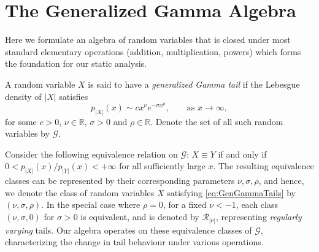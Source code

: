 \section{The Generalized Gamma Algebra}\label{sec:gga}

Here we formulate an algebra of random variables that is closed under most standard elementary operations (addition, multiplication, powers) which forms the foundation for our static analysis.

\begin{definition}\label{def:gg_tail}
A random variable $X$ is said to have a \emph{generalized Gamma tail} if the Lebesgue density of $|X|$ satisfies
\begin{equation}
\label{eq:GenGammaTails}
p_{|X|}(x) \sim c x^\nu e^{-\sigma x^\rho}, \qquad \text{as } x \to \infty,
\end{equation}
for some $c > 0$, $\nu \in \mathbb{R}$, $\sigma > 0$ and $\rho \in \mathbb{R}$. Denote the set of all such random variables by $\mathcal{G}$.
\end{definition}
Consider the following equivalence relation on $\mathcal{G}$: $X \equiv Y$ if and only if $0 < p_{|X|}(x) / p_{|Y|}(x) < +\infty$ for all sufficiently large $x$. The resulting equivalence classes can be represented by their corresponding parameters $\nu, \sigma, \rho$, and hence, we denote the class of random variables $X$ satisfying \cref{eq:GenGammaTails} by $(\nu,\sigma,\rho)$. In the special case where $\rho = 0$, for a fixed $\nu < -1$, each class $(\nu,\sigma,0)$ for $\sigma > 0$ is equivalent, and is denoted by $\mathcal{R}_{|\nu|}$, representing \emph{regularly varying} tails. Our algebra operates on these equivalence classes of $\mathcal{G}$, characterizing the change in tail behaviour under various operations.

